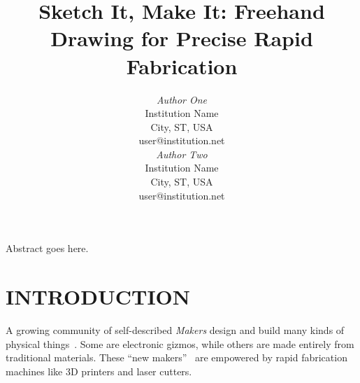 \documentclass{article}
\begin{document}

\toappear{}



\title{Sketch It, Make It: Freehand Drawing for Precise Rapid Fabrication}

\author{
\parbox[t]{9cm}{\centering
	     {\em Author One}\\
	     Institution Name\\
             City, ST, USA\\
	     user@institution.net}
\parbox[t]{9cm}{\centering
	     {\em Author Two}\\
	     Institution Name\\
             City, ST, USA\\
	     user@institution.net}
}

\maketitle

\abstract Abstract goes here. 






\section{INTRODUCTION}

A growing community of self-described \textit{Makers} design and build
many kinds of physical things~\cite{gershenfeld-fab}. Some are
electronic gizmos, while others are made entirely from traditional
materials. These ``new makers''~\cite{gross-new-makers} are empowered
by rapid fabrication machines like 3D printers and laser cutters.
\end{document}
